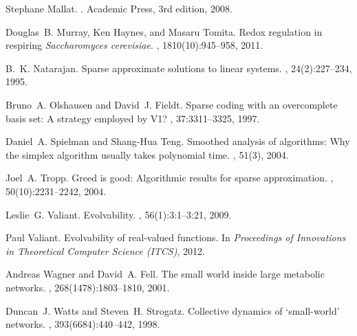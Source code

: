 \begin{thebibliography}{10}
Stephane Mallat.
.
\newblock Academic Press, 3rd edition, 2008.

Douglas~B. Murray, Ken Haynes, and Masaru Tomita.
\newblock Redox regulation in respiring \textit{Saccharomyces cerevisiae}.
, 1810(10):945--958, 2011.

B.~K. Natarajan.
\newblock Sparse approximate solutions to linear systems.
, 24(2):227--234, 1995.

Bruno~A. Olshausen and David~J. Fieldt.
\newblock Sparse coding with an overcomplete basis set: A strategy employed by
  {V1}?
, 37:3311--3325, 1997.

Daniel~A. Spielman and Shang-Hua Teng.
\newblock Smoothed analysis of algorithms: Why the simplex algorithm usually
  takes polynomial time.
, 51(3), 2004.

Joel~A. Tropp.
\newblock Greed is good: Algorithmic results for sparse approximation.
, 50(10):2231--2242,
  2004.

Leslie~G. Valiant.
\newblock Evolvability.
, 56(1):3:1--3:21, 2009.

Paul Valiant.
\newblock Evolvability of real-valued functions.
\newblock In {\em Proceedings of Innovations in Theoretical Computer Science
  (ITCS)}, 2012.

Andreas Wagner and David~A. Fell.
\newblock The small world inside large metabolic networks.
, 268(1478):1803--1810, 2001.

Duncan~J. Watts and Steven~H. Strogatz.
\newblock Collective dynamics of `small-world' networks.
, 393(6684):440--442, 1998.

\end{thebibliography}
